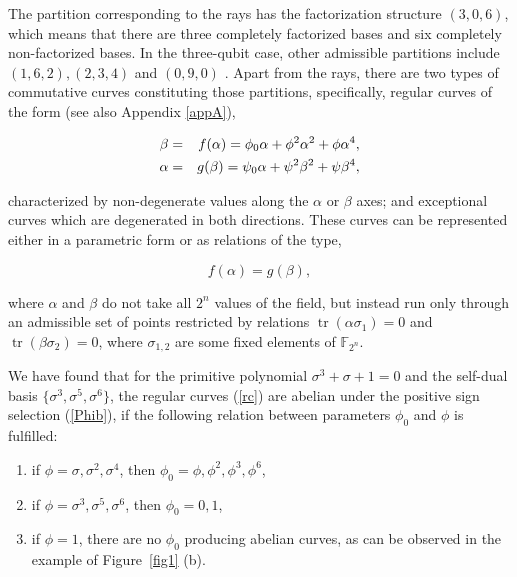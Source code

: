 \documentclass[quantumrep,article,submit,pdftex,moreauthors]{Definitions/mdpi}
\DeclareMathOperator{\tr}{tr}
\begin{document}
The partition corresponding to the rays has the factorization structure
$(3,0,6)$, which means that there are three completely factorized bases and six
completely non-factorized bases. In the three-qubit case, other admissible
partitions include $(1,6,2),(2,3,4)$ and $(0,9,0)$ \cite{factor1,factor2}.
Apart from the rays, there are two types of commutative curves constituting
those partitions, specifically, regular curves of the form \cite{GS2} (see also
Appendix \ref{appA}),

\begin{eqnarray}
  \beta
  &=& f(\alpha) = \phi_{0}\alpha +\phi^{2} \alpha^{2} + \phi \alpha^{4},
  \label{rc} \\
  \alpha
  &=& g(\beta) = \psi_{0}\alpha +\psi^{2} \beta^{2} + \psi \beta^{4},
  \notag
\end{eqnarray}

characterized by non-degenerate values along the $\alpha$ or $\beta$ axes; and
exceptional curves which are degenerated in both directions. These curves can be
represented either in a parametric form or as relations of the type,

\begin{equation*}
  f(\alpha) = g(\beta),
\end{equation*}

where $\alpha$ and $\beta$ do not take all $2^{n}$ values of the field, but
instead run only through an admissible set of points restricted by relations
$\tr(\alpha\sigma_{1}) = 0$ and $\tr(\beta\sigma_{2}) = 0$, where
$\sigma_{1,2}$ are some fixed elements of $\mathbb{F}_{2^{n}}$.

We have found that for the primitive polynomial $\sigma^{3} + \sigma + 1 = 0$
and the self-dual basis $\{\sigma^{3},\sigma^{5},\sigma^{6}\}$, the regular
curves (\ref{rc}) are abelian under the positive sign selection (\ref{Phib}), if
the following relation between parameters $\phi_{0}$ and $\phi$ is fulfilled:

\begin{enumerate}
  \item if $\phi =\sigma, \sigma^{2}, \sigma^{4}$, then $\phi_{0} =
    \phi,\phi^{2},\phi^{3}, \phi^{6}$,

  \item if $\phi = \sigma^{3}, \sigma^{5}, \sigma^{6}$, then $\phi_{0}=0,1$,

  \item if $\phi = 1$, there are no $\phi_{0}$ producing abelian curves, as can
    be observed in the example of Figure~\ref{fig1} (b).
\end{enumerate}
\end{document}
